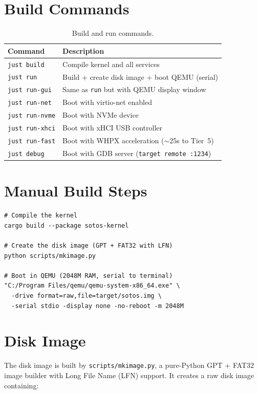\documentclass[11pt,a4paper,twoside]{report}
\theoremstyle{definition}
\newcommand{\file}[1]{\texttt{#1}}
\begin{document}
\section{Build Commands}

\begin{table}[H]
\centering
\caption{Build and run commands.}
\begin{tabularx}{\textwidth}{l X}
\toprule
\textbf{Command} & \textbf{Description} \\
\midrule
\texttt{just build}     & Compile kernel and all services \\
\texttt{just run}       & Build + create disk image + boot QEMU (serial) \\
\texttt{just run-gui}   & Same as \texttt{run} but with QEMU display window \\
\texttt{just run-net}   & Boot with virtio-net enabled \\
\texttt{just run-nvme}  & Boot with NVMe device \\
\texttt{just run-xhci}  & Boot with xHCI USB controller \\
\texttt{just run-fast}  & Boot with WHPX acceleration (${\sim}$25s to Tier~5) \\
\texttt{just debug}     & Boot with GDB server (\texttt{target remote :1234}) \\
\bottomrule
\end{tabularx}
\end{table}

\section{Manual Build Steps}

\begin{lstlisting}[language={},caption={Manual build and boot sequence.}]
# Compile the kernel
cargo build --package sotos-kernel

# Create the disk image (GPT + FAT32 with LFN)
python scripts/mkimage.py

# Boot in QEMU (2048M RAM, serial to terminal)
"C:/Program Files/qemu/qemu-system-x86_64.exe" \
  -drive format=raw,file=target/sotos.img \
  -serial stdio -display none -no-reboot -m 2048M
\end{lstlisting}

\section{Disk Image}

The disk image is built by \file{scripts/mkimage.py}, a pure-Python GPT +
FAT32 image builder with Long File Name (LFN) support. It creates a raw
disk image containing:
\end{document}
